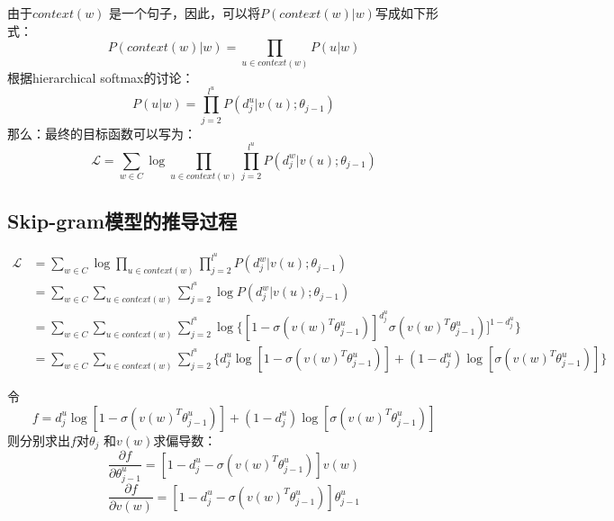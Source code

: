     由于$context(w)$ 是一个句子，因此，可以将$P(context(w)|w)$写成如下形式：
    \begin{equation}
        P(context(w)|w) = \prod_{u \in context(w)}P(u|w)
    \end{equation}
    根据hierarchical softmax的讨论：
    \begin{equation}
        P(u|w) = \prod_{j=2}^{l^u}P(d_j^u|v(u); \theta_{j-1})
    \end{equation}
    那么：最终的目标函数可以写为：
    \begin{equation}
        \mathcal{L} = \sum_{w \in C} \log \prod_{u \in context(w)} \prod_{j=2}^{l^u}P(d_j^w|v(u); \theta_{j-1})
    \end{equation}

    \subsection{Skip-gram模型的推导过程}
    \begin{equation}
        \begin{split}
            \mathcal{L} &= \sum_{w \in C} \log \prod_{u \in context(w)} \prod_{j=2}^{l^u}P(d_j^w|v(u); \theta_{j-1}) \\
            &= \sum_{w \in C}\sum_{u \in context(w)} \sum_{j=2}^{l^u} \log P(d_j^w|v(u); \theta_{j-1})\\
            &= \sum_{w \in C}\sum_{u \in context(w)} \sum_{j=2}^{l^u} \log \{ [1-\sigma(v(w)^T\theta_{j-1}^{u})]^{d_j^u} \sigma(v(w)^T\theta_{j-1}^{u})]^{1-d_j^u} \}\\
            &=\sum_{w \in C}\sum_{u \in context(w)} \sum_{j=2}^{l^u} \{d_j^u\log [1-\sigma(v(w)^T\theta_{j-1}^{u})] + (1-d_j^u)\log [\sigma(v(w)^T\theta_{j-1}^{u})]\}
        \end{split}
    \end{equation}

    令
    \begin{equation}
        f = d_j^u\log [1-\sigma(v(w)^T\theta_{j-1}^{u})] + (1-d_j^u)\log [\sigma(v(w)^T\theta_{j-1}^{u})]
    \end{equation}
    则分别求出$f$对$\theta_j$ 和$v(w)$求偏导数：
    \begin{equation}
        \frac{\partial{f}}{\partial{\theta_{j-1}^{u}}}=[1-d_j^u-\sigma(v(w)^T\theta_{j-1}^{u})] v(w)
    \end{equation}
    \begin{equation}
        \frac{\partial{f}}{\partial{v(w)}} = [1-d_j^u-\sigma(v(w)^T\theta_{j-1}^{u})] \theta_{j-1}^{u}
    \end{equation}

